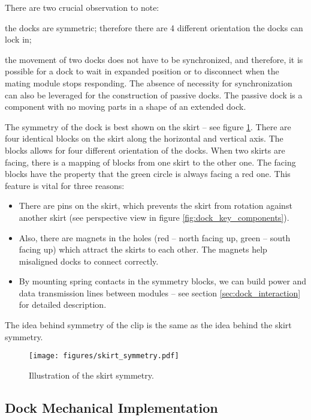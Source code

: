 There are two crucial observation to note:
\begin{enumerate*}
    \item the docks are symmetric; therefore there are 4 different orientation
    the docks can lock in;
    \item the movement of two docks does not have to be synchronized, and
    therefore, it is possible for a dock to wait in expanded position or to
    disconnect when the mating module stops responding. The absence of necessity
    for synchronization can also be leveraged for the construction of passive
    docks. The passive dock is a component with no moving parts in a shape of
    an extended dock.
\end{enumerate*}

The symmetry of the dock is best shown on the skirt -- see figure
\ref{fig:dock_skirt_symmetry}. There are four identical blocks on the skirt
along the horizontal and vertical axis. The blocks allows for four different
orientation of the docks. When two skirts are facing, there is a mapping of
blocks from one skirt to the other one. The facing blocks have the property that
the green circle is always facing a red one. This feature is vital for
three reasons:
\begin{itemize}
    \item There are pins on the skirt, which prevents the skirt from
    rotation against another skirt (see perspective view in figure
    \ref{fig:dock_key_components}).
    \item Also, there are magnets in the holes (red -- north facing up, green --
    south facing up) which attract the skirts to each other. The magnets help
    misaligned docks to connect correctly.
    \item By mounting spring contacts in the symmetry blocks, we can build power
    and data transmission lines between modules -- see section
    \ref{sec:dock_interaction} for detailed description.
\end{itemize}
The idea behind symmetry of the clip is the same as the idea behind the skirt
symmetry.

\begin{figure}[!ht]
    \centering
    \texttt{[image: figures/skirt\_symmetry.pdf]}
    \caption{Illustration of the skirt symmetry.}
    \label{fig:dock_skirt_symmetry}
\end{figure}

\subsection{Dock Mechanical Implementation}

